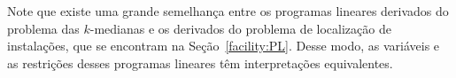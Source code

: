 Note que existe uma grande semelhança entre os programas lineares derivados do problema das $k$-medianas e os derivados do problema de localização de instalações, que se encontram na Seção~\ref{facility:PL}. Desse modo, as variáveis e as restrições desses programas lineares têm interpretações equivalentes.